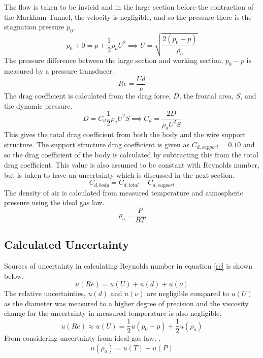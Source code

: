 \documentclass[8pt]{article}
\begin{document}
The flow is taken to be invicid and in the large section before the contraction of the Markham Tunnel, the velocity is negligible, and so the pressure there is the stagnation pressure $p_0$.
\begin{equation}
    p_0 + 0 = p + \frac{1}{2}\rho_a U^2 \implies U = \sqrt{\frac{2(p_0-p)}{\rho_a}}
    \label{eq1}
\end{equation}
The pressure difference between the large section and working section, $p_0 - p$ is measured by a pressure transducer.
\begin{equation}
    Re = \frac{Ud}{\nu}
    \label{re}
\end{equation}
The drag coefficient is calculated from the drag force, $D$, the frontal area, $S$, and the dynamic pressure.
\begin{equation}
    D = C_d \frac{1}{2} \rho_a U^2 S \implies C_d = \frac{2D}{ \rho_a U^2 S}
    \label{eq3}
\end{equation}
This gives the total drag coefficient from both the body and the wire support structure.
The support structure drag coefficient is given as $C_{d, support} = 0.10$ and so the drag coefficient of the body is calculated by subtracting this from the total drag coefficient.
This value is also assumed to be constant with Reynolds number, but is taken to have an uncertainty which is discussed in the next section.
\begin{equation}
    C_{d, body} = C_{d, total} - C_{d, support}
\end{equation}
The density of air is calculated from measured temperature and atmospheric pressure using the ideal gas law.
\begin{equation}
    \rho_a = \frac{P}{RT}
\end{equation}

\subsection{Calculated Uncertainty}

Sources of uncertainty in calculating Reynolds number in equation \ref{re} is shown below.
\begin{equation}
    u(Re) = u(U) + u(d) + u(\nu)
\end{equation}
The relative uncertainties, $u(d)$ and $u(\nu)$ are negligible compared to $u(U)$ as the diameter was measured to a higher degree of precision and the viscosity change for the uncertainty in measured temperature is also negligible.
\begin{equation}
    u(Re) \approx u(U) = \frac{1}{2}u(p_0-p) + \frac{1}{2}u(\rho_a)
    \label{eq5}
\end{equation}
From considering uncertainty from ideal gas law, .
\begin{equation}
     u(\rho_a) = u(T) + u(P)
\end{equation}
\end{document}
